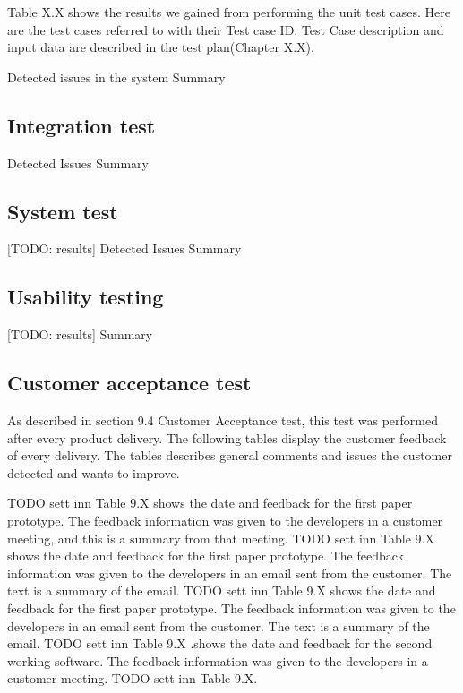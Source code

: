 Table X.X shows the results we gained from performing the unit test cases. Here are the test cases referred to with their Test case ID. Test Case description and input data are described in the test plan(Chapter X.X).\newline

Detected issues in the system\newline 
Summary \newline 

\subsection{Integration test}
Detected Issues\newline
Summary

\subsection{System test}
[TODO: results]\newline
Detected Issues\newline
Summary

\subsection{Usability testing}
[TODO: results]\newline
Summary

\subsection{Customer acceptance test}

As described in section 9.4 Customer Acceptance test, this test was performed after every product delivery. The following tables display the customer feedback of every delivery. The tables describes general comments and issues the customer detected and wants to improve.  

TODO sett inn Table 9.X shows the date and feedback for the first paper prototype. The feedback information was given to the developers in a customer meeting, and this is a summary from that meeting.\newline
TODO sett inn Table 9.X shows the date and feedback for the first paper prototype. The feedback information was given to the developers in an email sent from the customer. The text is a summary of the email.\newline
TODO sett inn Table 9.X shows the date and feedback for the first paper prototype. The feedback information was given to the developers in an email sent from the customer. The text is a summary of the email.\newline
TODO sett inn Table 9.X .shows the date and feedback for the second working software. The feedback information was given to the developers in a customer meeting.\newline
TODO sett inn Table 9.X.

\cleardoublepage